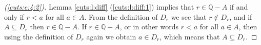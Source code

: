 \begin{proof}[(\ref{cuts:e:4:2})]
	Lemma \ref{cuts:l:diff} (\ref{cuts:l:diff:1}) implies that $r \in \mathbb{Q} - A$ if and only if $r < a$ for all $a \in A$. From the definition of $D_r$ we see that $r \notin D_r$, and if $A \subseteq D_r$ then $r \in \mathbb{Q} - A$. If $r \in \mathbb{Q} - A$, or in other words $r < a$ for all $a \in A$, then using the definition of $D_r$ again we obtain $a \in D_r$, which means that $A \subseteq D_r$.
\end{proof}